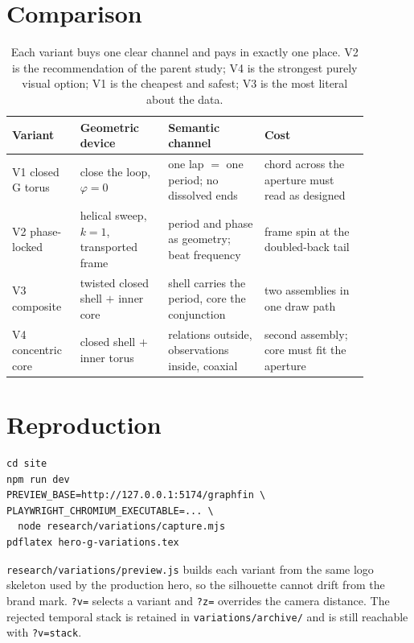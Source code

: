 \documentclass[11pt,a4paper]{article}
\begin{document}
\section{Comparison}

\begin{table}[htbp]
\centering
\small
\begin{tabular}{@{}p{0.16\linewidth}p{0.22\linewidth}p{0.24\linewidth}p{0.26\linewidth}@{}}
\toprule
\textbf{Variant} & \textbf{Geometric device} & \textbf{Semantic channel} & \textbf{Cost} \\
\midrule
V1 closed G torus &
close the loop, $\varphi=0$ &
one lap $=$ one period; no dissolved ends &
chord across the aperture must read as designed \\
\addlinespace
V2 phase-locked &
helical sweep, $k=1$, transported frame &
period and phase as geometry; beat frequency &
frame spin at the doubled-back tail \\
\addlinespace
V3 composite &
twisted closed shell $+$ inner core &
shell carries the period, core the conjunction &
two assemblies in one draw path \\
\addlinespace
V4 concentric core &
closed shell $+$ inner torus &
relations outside, observations inside, coaxial &
second assembly; core must fit the aperture \\
\bottomrule
\end{tabular}
\caption{Each variant buys one clear channel and pays in exactly one place.
V2 is the recommendation of the parent study; V4 is the strongest purely visual
option; V1 is the cheapest and safest; V3 is the most literal about the data.}
\label{tab:compare}
\end{table}

\section{Reproduction}

\begin{verbatim}
cd site
npm run dev
PREVIEW_BASE=http://127.0.0.1:5174/graphfin \
PLAYWRIGHT_CHROMIUM_EXECUTABLE=... \
  node research/variations/capture.mjs
pdflatex hero-g-variations.tex
\end{verbatim}

\noindent
\texttt{research/variations/preview.js} builds each variant from the same logo
skeleton used by the production hero, so the silhouette cannot drift from the
brand mark. \texttt{?v=} selects a variant and \texttt{?z=} overrides the camera
distance. The rejected temporal stack is retained in
\texttt{variations/archive/} and is still reachable with \texttt{?v=stack}.
\end{document}
